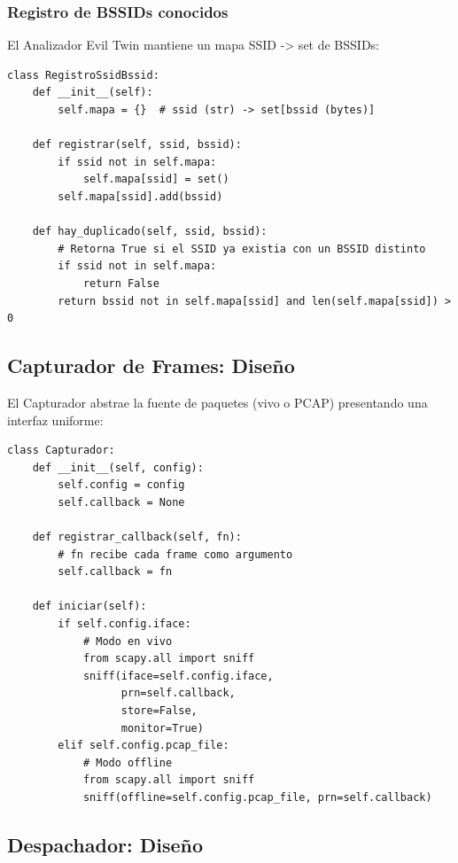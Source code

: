 \documentclass[11pt,a4paper]{article}
\begin{document}
\subsubsection{Registro de BSSIDs conocidos}
El Analizador Evil Twin mantiene un mapa SSID -> set de BSSIDs:

\begin{lstlisting}
class RegistroSsidBssid:
    def __init__(self):
        self.mapa = {}  # ssid (str) -> set[bssid (bytes)]

    def registrar(self, ssid, bssid):
        if ssid not in self.mapa:
            self.mapa[ssid] = set()
        self.mapa[ssid].add(bssid)

    def hay_duplicado(self, ssid, bssid):
        # Retorna True si el SSID ya existia con un BSSID distinto
        if ssid not in self.mapa:
            return False
        return bssid not in self.mapa[ssid] and len(self.mapa[ssid]) > 0
\end{lstlisting}

\subsection{Capturador de Frames: Diseño}

El Capturador abstrae la fuente de paquetes (vivo o PCAP) presentando
una interfaz uniforme:

\begin{lstlisting}
class Capturador:
    def __init__(self, config):
        self.config = config
        self.callback = None

    def registrar_callback(self, fn):
        # fn recibe cada frame como argumento
        self.callback = fn

    def iniciar(self):
        if self.config.iface:
            # Modo en vivo
            from scapy.all import sniff
            sniff(iface=self.config.iface,
                  prn=self.callback,
                  store=False,
                  monitor=True)
        elif self.config.pcap_file:
            # Modo offline
            from scapy.all import sniff
            sniff(offline=self.config.pcap_file, prn=self.callback)
\end{lstlisting}

\subsection{Despachador: Diseño}
\end{document}
